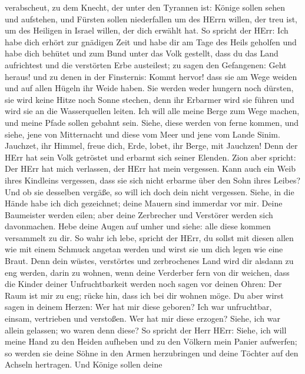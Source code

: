 verabscheut, zu dem Knecht, der unter den Tyrannen ist: Könige sollen
sehen und aufstehen, und Fürsten sollen niederfallen um des HErrn
willen, der treu ist, um des Heiligen in Israel willen, der dich erwählt
hat.  So spricht der HErr: Ich habe dich erhört zur gnädigen
Zeit und habe dir am Tage des Heils geholfen und habe dich behütet und
zum Bund unter das Volk gestellt, dass du das Land aufrichtest und die
verstörten Erbe austeilest;  zu sagen den Gefangenen: Geht
heraus! und zu denen in der Finsternis: Kommt hervor! dass sie am Wege
weiden und auf allen Hügeln ihr Weide haben.  Sie werden
weder hungern noch dürsten, sie wird keine Hitze noch Sonne stechen,
denn ihr Erbarmer wird sie führen und wird sie an die Wasserquellen
leiten.  Ich will alle meine Berge zum Wege machen, und
meine Pfade sollen gebahnt sein.  Siehe, diese werden von
ferne kommen, und siehe, jene von Mitternacht und diese vom Meer und
jene vom Lande Sinim.  Jauchzet, ihr Himmel, freue dich,
Erde, lobet, ihr Berge, mit Jauchzen! Denn der HErr hat sein Volk
getröstet und erbarmt sich seiner Elenden.  Zion aber
spricht: Der HErr hat mich verlassen, der HErr hat mein vergessen.
 Kann auch ein Weib ihres Kindleins vergessen, dass sie
sich nicht erbarme über den Sohn ihres Leibes? Und ob sie desselben
vergäße, so will ich doch dein nicht vergessen.  Siehe, in
die Hände habe ich dich gezeichnet; deine Mauern sind immerdar vor mir.
 Deine Baumeister werden eilen; aber deine Zerbrecher und
Verstörer werden sich davonmachen.  Hebe deine Augen auf
umher und siehe: alle diese kommen versammelt zu dir. So wahr ich lebe,
spricht der HErr, du sollst mit diesen allen wie mit einem Schmuck
angetan werden und wirst sie um dich legen wie eine Braut. 
Denn dein wüstes, verstörtes und zerbrochenes Land wird dir alsdann zu
eng werden, darin zu wohnen, wenn deine Verderber fern von dir weichen,
 dass die Kinder deiner Unfruchtbarkeit werden noch sagen
vor deinen Ohren: Der Raum ist mir zu eng; rücke hin, dass ich bei dir
wohnen möge.  Du aber wirst sagen in deinem Herzen: Wer hat
mir diese geboren? Ich war unfruchtbar, einsam, vertrieben und
verstoßen. Wer hat mir diese erzogen? Siehe, ich war allein gelassen; wo
waren denn diese?  So spricht der Herr HErr: Siehe, ich
will meine Hand zu den Heiden aufheben und zu den Völkern mein Panier
aufwerfen; so werden sie deine Söhne in den Armen herzubringen und deine
Töchter auf den Achseln hertragen.  Und Könige sollen deine
